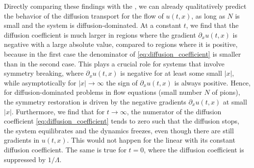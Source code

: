 Directly comparing these findings with the \he{}, we can already qualitatively predict the behavior of the diffusion transport for the \frg{} flow of $u ( t, x )$, as long as $N$ is small and the system is diffusion-dominated.
At a constant \rgtime{} $t$, we find that the diffusion coefficient is much larger in regions where the gradient $\partial_x u ( t, x )$ is negative with a large absolute value, compared to regions where it is positive, because in the first case the denominator of \cref{eq:diffusion_coefficient} is smaller than in the second case.
This plays a crucial role for systems that involve symmetry breaking, where $\partial_x u ( t, x )$ is negative for at least some small $|x|$, while asymptotically for $|x| \rightarrow \infty$ the sign of $\partial_x u ( t, x )$ is always positive.
Hence, for diffusion-dominated problems in \frg{} flow equations (small number $N$ of pions), the symmetry restoration is driven by the negative gradients $\partial_x u ( t, x )$ at small $|x|$.
Furthermore, we find that for $t \rightarrow \infty$, the numerator of the diffusion coefficient \eqref{eq:diffusion_coefficient} tends to zero such that the diffusion stops, the system equilibrates and the dynamics freezes, even though there are still gradients in $u ( t, x )$.
This would not happen for the linear \he{} with its constant diffusion coefficient.
The same is true for $t = 0$, where the diffusion coefficient is suppressed by $1/\Lambda$.

